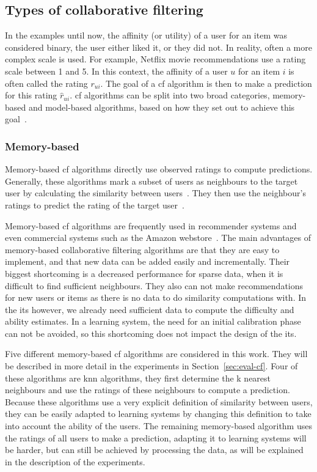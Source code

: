 \subsection{Types of collaborative filtering}
In the examples until now, the affinity (or utility) of a user for an item was considered binary, the user either liked it, or they did not.
In reality, often a more complex scale is used.
For example, Netflix movie recommendations use a rating scale between 1 and 5.
In this context, the affinity of a user $u$ for an item $i$ is often called the rating $r_{ui}$.
The goal of a \gls{cf} algorithm is then to make a prediction for this rating $\hat{r}_{ui}$.
\Gls{cf} algorithms can be split into two broad categories, memory-based and model-based algorithms, based on how they set out to achieve this goal~\cite{li2021novel,sharma2017collaborative,yu2004probabilistic,breese2013empirical,su2009survey}.

\subsubsection{Memory-based}
Memory-based \gls{cf} algorithms directly use observed ratings to compute predictions.
Generally, these algorithms mark a subset of users as neighbours to the target user by calculating the similarity between users~\cite{li2021novel,Hug2020}.
They then use the neighbour's ratings to predict the rating of the target user~\cite{su2009survey,Hug2020,Koren2010,Ricci2010}.

Memory-based \gls{cf} algorithms are frequently used in recommender systems and even commercial systems such as the Amazon webstore~\cite{sharma2017collaborative,yu2004probabilistic}.
The main advantages of memory-based collaborative filtering algorithms are that they are easy to implement, and that new data can be added easily and incrementally.
Their biggest shortcoming is a decreased performance for sparse data, when it is difficult to find sufficient neighbours.
They also can not make recommendations for new users or items as there is no data to do similarity computations with.
In the \gls{its} however, we already need sufficient data to compute the difficulty and ability estimates.
In a learning system, the need for an initial calibration phase can not be avoided, so this shortcoming does not impact the design of the \gls{its}.

Five different memory-based \gls{cf} algorithms are considered in this work. 
They will be described in more detail in the experiments in Section~\ref{sec:eval-cf}.
Four of these algorithms are \gls{knn} algorithms, they first determine the k nearest neighbours and use the ratings of these neighbours to compute a prediction.
Because these algorithms use a very explicit definition of similarity between users, they can be easily adapted to learning systems by changing this definition to take into account the ability of the users.
The remaining memory-based algorithm uses the ratings of all users to make a prediction, adapting it to learning systems will be harder, but can still be achieved by processing the data, as will be explained in the description of the experiments.

